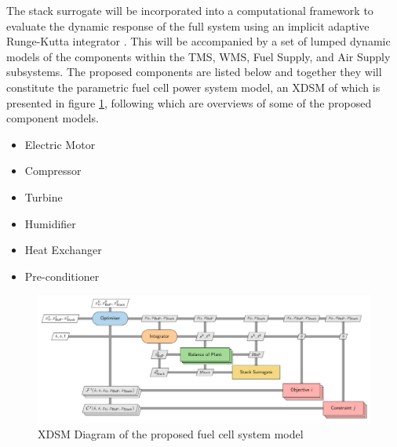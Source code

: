 The stack surrogate will be incorporated into a computational framework to evaluate the dynamic response of the full system using an implicit adaptive Runge-Kutta integrator \cite{SolvingOrdinaryDifferential}.
This will be accompanied by a set of lumped dynamic models of the components within the TMS, WMS, Fuel Supply, and Air Supply subsystems.
The proposed components are listed below and together they will constitute the parametric fuel cell power system model, an XDSM of which is presented in figure \ref{fig:xdsm}, following which are overviews of some of the proposed component models.
\begin{multicols}{2}
	\begin{itemize}
		\item Electric Motor
		\item Compressor
		\item Turbine
		\item Humidifier
		\item Heat Exchanger
		\item Pre-conditioner
	\end{itemize}
\end{multicols}
\begin{center}
	\begin{figure}[h]
		\includegraphics[width=\linewidth]{figures/xdsm.pdf}
		\caption{XDSM Diagram of the proposed fuel cell system model}
		\label{fig:xdsm}
	\end{figure}
\end{center}

